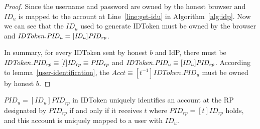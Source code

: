 \begin{proof}
    Since the username and password are owned by the honest browser and 
    $ID_u$ is mapped to the account at Line~\ref{line:get-idu} in Algorithm~\ref{alg:idp}. 
    Now we can see that the $ID_u$ used to generate IDToken must be owned by the browser 
    and $\mathit{IDToken}.\mathit{PID_{u}}=[\mathit{ID_u}]\mathit{PID_{rp}}$.

    In summary, for every IDToken sent by honest $b$ and IdP, there must be 
    $\mathit{IDToken}.\mathit{PID_{rp}} \equiv [t]\mathit{ID_{rp}} \equiv \mathit{PID_{rp}}$ and 
    $\mathit{IDToken}.\mathit{PID_{u}} \equiv [\mathit{ID_u}]\mathit{PID_{rp}}$. 
    According to lemma~\ref{user-identification}, 
    the $Acct \equiv [t^{-1}]IDToken.PID_u$ must be owned by honest $b$.
  \end{proof}

  \begin{lemma}\label{user-identification}
    $PID_u= [ID_u]PID_{rp}$ in IDToken uniquely identifies an 
    account at the RP designated by $PID_{rp}$ if and only if 
    it receives $t$ where $PID_{rp} = [t]ID_{rp}$ holds, and 
    this account is uniquely mapped to a user with $ID_u$.
  \end{lemma}
